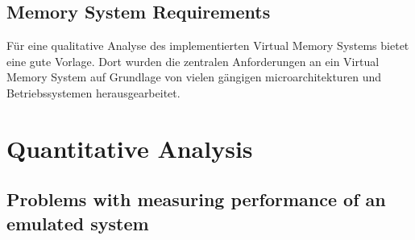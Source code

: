 
\subsection{Memory System Requirements} %
Für eine qualitative Analyse des implementierten Virtual Memory Systems bietet \cite{jacobSoftwaremanagedAddressTranslation1997}
eine gute Vorlage. Dort wurden die zentralen Anforderungen an ein Virtual Memory System auf Grundlage
von vielen gängigen microarchitekturen und Betriebssystemen herausgearbeitet.




%
\section{Quantitative Analysis}
\subsection{Problems with measuring performance of an emulated system}
















